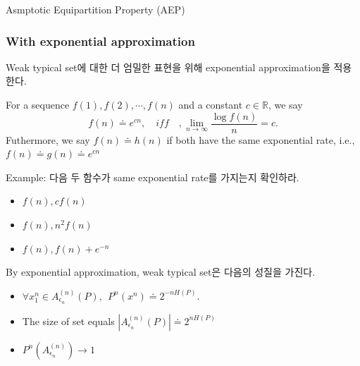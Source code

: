 \documentclass[9pt]{beamer}
\begin{document}
\begin{section}{Asmptotic Equipartition Property (AEP)}
\begin{frame}
        \end{frame}  

        \begin{frame}
            \frametitle{With exponential approximation }
            Weak typical set에 대한 더 엄밀한 표현을 위해 exponential approximation을 적용한다.
            \begin{definition}
                For a sequence $f(1), f(2), \cdots, f(n)$ and a constant $c \in \mathbb R$, we say 
                $$f(n) \doteq e^{cn}, \quad iff \quad, \lim_{n \rightarrow \infty} \frac{\log f(n)}{n} = c.$$
                Futhermore, we say  $ f(n) \doteq h(n)$  if both have the same exponential rate, i.e., $f(n) \doteq g(n) \doteq e^{cn}$
            \end{definition}
            \vspace{0.2cm}
            Example: 다음 두 함수가 same exponential rate를 가지는지 확인하라.
            \begin{itemize}
                \item $f(n), cf(n)$
                \item $f(n), n^2 f(n)$
                \item $f(n), f(n)+e^{-n}$
            \end{itemize}
            
            \vspace{0.2cm}
            By exponential approximation, weak typical set은 다음의 성질을 가진다.
            \begin{itemize}
                \item $\forall x_1^n \in A_{\epsilon_n}^{(n)}(P),\ \  P^n\left(x^n\right) \doteq 2^{-n H(P)} .$
                \item The size of set equals $|A_{\epsilon_n}^{(n)}(P)| \doteq 2^{nH(P)}$
                \item $P^n(A_{\epsilon_n}^{(n)}) \rightarrow 1$
            \end{itemize}
        \end{frame}


\end{section}
\end{document}
